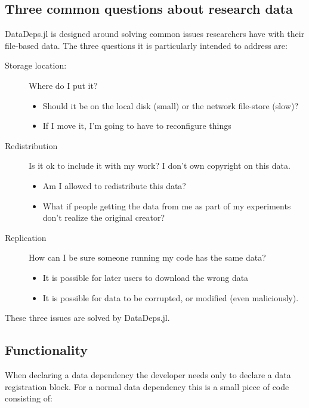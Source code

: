\documentclass[twoside,11pt]{article}
\begin{document}
\subsection{Three common questions about research data}
DataDeps.jl is designed around solving common issues researchers have with their file-based data.
The three questions it is particularly intended to address are:

\begin{description}
	\item[Storage location:] Where do I put it? \label{itm:where}
	\begin{itemize}
		\item Should it be on the local disk (small) or the network file-store (slow)?
		\item If I move it, I'm going to have to reconfigure things
	\end{itemize}
	\item[Redistribution] Is it ok to include it with my work? \label{itm:ownredistribute} I don't own copyright on this data.
	\begin{itemize}
		\item Am I allowed to redistribute this data?
		\item What if people getting the data from me as part of my experiments don't realize the original creator?
	\end{itemize}
	\item[Replication] How can I be sure someone running my code has the same data?
	\begin{itemize}
		\item It is possible for later users to download the wrong data
		\item It is possible for data to be corrupted, or modified (even maliciously).
	\end{itemize}
\end{description}
These three issues are solved by DataDeps.jl.

\subsection{Functionality}
When declaring a data dependency the developer needs only to declare a data registration block.
For a normal data dependency this is a small piece of code consisting of:
\end{document}
